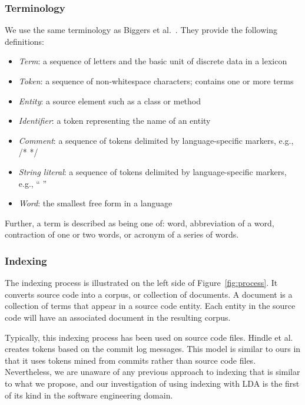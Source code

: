     \subsubsection{Terminology}
    We use the same terminology as Biggers et al.~\cite{Biggers-etal:2011}.
    They provide the following definitions:
    \begin{itemize}
    \setlength{\itemsep}{1pt}
    \setlength{\parskip}{0pt}
    \setlength{\parsep}{0pt}
    \item \textit{Term}: a sequence of letters and the basic unit of discrete data in a lexicon
    \item \textit{Token}: a sequence of non-whitespace characters; contains one or more terms
    \item \textit{Entity}: a source element such as a class or method
    \item \textit{Identifier}: a token representing the name of an entity
    \item \textit{Comment}: a sequence of tokens delimited by language-specific markers, e.g., /* */
    \item \textit{String literal}: a sequence of tokens delimited by language-specific markers, e.g., “ ”
    \item \textit{Word}: the smallest free form in a language
    \end{itemize}
    Further, a term is described as being one of:
    word, abbreviation of a word, contraction of one or two words,
    or acronym of a series of words.

    \subsubsection{Indexing}
    The indexing process is illustrated on the left side of Figure~\ref{fig:process}.
    It converts source code into a corpus, or collection of documents.
    A document is a collection of terms that appear in a source code entity.
    Each entity in the source code will have an associated document in the resulting corpus.

    Typically, this indexing process has been used on source code files.
    Hindle et al. ~\cite{Hindle-etal:2009} creates tokens based on the commit log messages.
    This model is similar to ours in that it uses tokens mined from commits rather than source code files.
    Nevertheless, we are unaware of any previous approach to indexing that is similar to what we propose,
    and our investigation of using indexing with LDA is the first of its kind in the software engineering domain.

